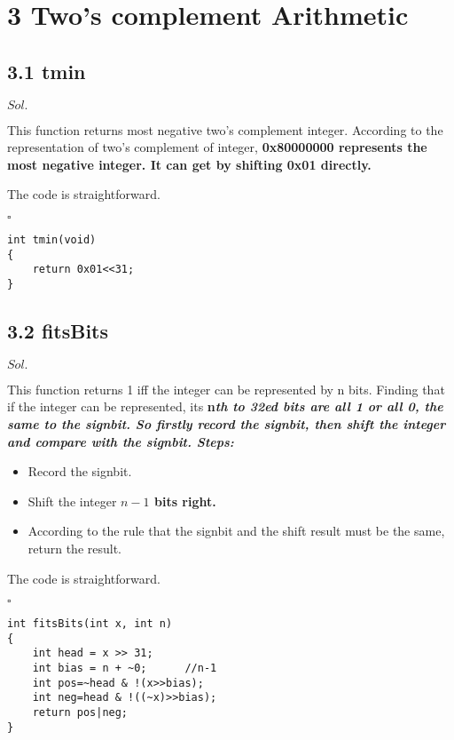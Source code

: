 \documentclass[a4paper, 11pt]{article}
\newenvironment{sol}[1] {\par \noindent $#1.$} {\par \hfill $\square$}
\begin{document}
\section*{3 Two's complement Arithmetic}

\subsection*{3.1 tmin}

\begin{sol}{Sol}

This function returns most negative two's complement integer. According to the representation of two's complement of integer, \bfseries 0x80000000 \mdseries represents the most negative integer. It can get by shifting 0x01 directly.

The code is straightforward.
\end{sol}
\begin{lstlisting}
int tmin(void)
{
    return 0x01<<31;
}
\end{lstlisting}

\subsection*{3.2 fitsBits}

\begin{sol}{Sol}

This function returns 1 iff the integer can be represented by n bits. Finding that if the integer can be represented, its \bfseries n\itshape th \normalfont\mdseries to \bfseries 32\itshape ed \normalfont\mdseries bits are all 1 or all 0, the same to the signbit. So firstly record the signbit, then shift the integer and compare with the signbit. Steps:

\begin{itemize}
    \item Record the signbit.
    \item Shift the integer \bfseries $n-1$ \mdseries bits right.
    \item According to the rule that the signbit and the shift result must be the same, return the result.
\end{itemize}

The code is straightforward.
\end{sol}
\begin{lstlisting}
int fitsBits(int x, int n)
{
    int head = x >> 31;
    int bias = n + ~0;		//n-1
    int pos=~head & !(x>>bias);
    int neg=head & !((~x)>>bias);
    return pos|neg;
}
\end{lstlisting}
\end{document}

